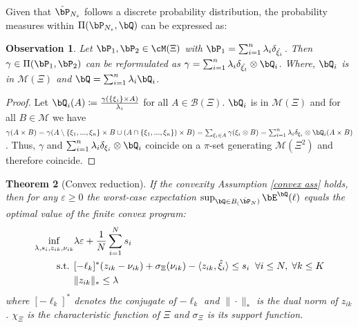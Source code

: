 \documentclass[11pt,a4paper,oneside,openany]{book}
\newtheorem{theorem}{Theorem}
\newtheorem{observation}[theorem]{Observation}
\numberwithin{definition}{section}
\numberwithin{theorem}{section}
\numberwithin{problem}{section}
\begin{document}
Given that $\hat \bP_{N_s}$ follows a discrete probability distribution, the probability measures within $\Pi(\bP_{N_s}, \bQ)$ can be expressed as:

\begin{observation}
Let $\bP_1,\bP_2 \in \cM(\Xi)$ with $\bP_1 = \sum_{i=1}^n \lambda_i\delta_{\hat{\xi_i}}$. Then $\gamma \in \Pi(\bP_1,\bP_2)$ can be reformulated as $\gamma = \sum_{i=1}^n \lambda_i \delta_{\hat{\xi_t}}\otimes \bQ_i$. Where, $\bQ_i$ is in $\mathcal{M}(\Xi)$ and $\bQ=\sum_{i=1}^n\lambda_i\bQ_i$.
\end{observation}


\begin{proof}
    Let $\bQ_i(A) \coloneqq \frac{\gamma(\{\xi_i\}\times A)}{\lambda_i}$ for all $A \in \mathcal{B}(\Xi)$. $\bQ_i$ is in $\mathcal{M}(\Xi)$ and for all $B \in \mathcal{M}$ we have $\gamma(A\times B) = \gamma(A \setminus \{\xi_1,...,\xi_n\} \times B \cup (A \cap \{\xi_1,...,\xi_n\}) \times B) = \sum_{\xi_i \in A}\gamma(\xi_i \otimes B) =  \sum_{i=1}^n \lambda_i \delta_{\xi_i}\otimes \bQ_i(A \times B)$. Thus, $\gamma$ and $\sum_{i=1}^n \lambda_i \delta_{\xi_i}\otimes \bQ_i$ coincide on a $\pi$-set generating $\mathcal{M}(\Xi^2)$ and therefore coincide.
\end{proof}


\begin{theorem}[Convex reduction] \label{Kuhn finite reduction}
If the convexity Assumption \ref{convex ass} holds, then for any $\varepsilon \geq 0$ the worst-case expectation $\sup_{\bQ \in B_(\hat \bP_N)}\bE^{\bQ}(\ell)$ equals the optimal value of the finite convex program: 
\begin{align} \label{finiteconvexprogramfinitereduction}
    \inf_{\lambda, s_i, z_{ik}, \nu_{ik}} & \lambda \varepsilon + \frac{1}{N}\sum_{i=1}^N s_i \\
\textup{s.t. } & [-\ell_k]^*(z_{ik}-\nu_{ik}) + \sigma_{\Xi}(\nu_{ik})-\langle z_{ik}, \hat \xi_i\rangle \leq s_i \; \; \forall i \leq N, \; \forall k \leq K \\
& \|z_{ik}\|_* \leq \lambda
\end{align}
where $[-\ell_k]^*$ denotes the conjugate of $-\ell_k$ and $\|\cdot\|_* $ is the dual norm of $z_{ik}$. $\chi_{\Xi}$ is the characteristic function of $\Xi$ and $\sigma_{\Xi}$ is its support function.
\end{theorem}
\end{document}
